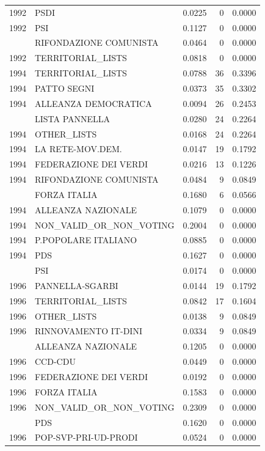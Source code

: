 \begin{longtable}[t]{rlrrr}
1992 & PSDI & 0.0225 & 0 & 0.0000\\
1992 & PSI & 0.1127 & 0 & 0.0000\\
\addlinespace
1992 & RIFONDAZIONE COMUNISTA & 0.0464 & 0 & 0.0000\\
1992 & TERRITORIAL\_LISTS & 0.0818 & 0 & 0.0000\\
1994 & TERRITORIAL\_LISTS & 0.0788 & 36 & 0.3396\\
1994 & PATTO SEGNI & 0.0373 & 35 & 0.3302\\
1994 & ALLEANZA DEMOCRATICA & 0.0094 & 26 & 0.2453\\
\addlinespace
1994 & LISTA PANNELLA & 0.0280 & 24 & 0.2264\\
1994 & OTHER\_LISTS & 0.0168 & 24 & 0.2264\\
1994 & LA RETE-MOV.DEM. & 0.0147 & 19 & 0.1792\\
1994 & FEDERAZIONE DEI VERDI & 0.0216 & 13 & 0.1226\\
1994 & RIFONDAZIONE COMUNISTA & 0.0484 & 9 & 0.0849\\
\addlinespace
1994 & FORZA ITALIA & 0.1680 & 6 & 0.0566\\
1994 & ALLEANZA NAZIONALE & 0.1079 & 0 & 0.0000\\
1994 & NON\_VALID\_OR\_NON\_VOTING & 0.2004 & 0 & 0.0000\\
1994 & P.POPOLARE ITALIANO & 0.0885 & 0 & 0.0000\\
1994 & PDS & 0.1627 & 0 & 0.0000\\
\addlinespace
1994 & PSI & 0.0174 & 0 & 0.0000\\
1996 & PANNELLA-SGARBI & 0.0144 & 19 & 0.1792\\
1996 & TERRITORIAL\_LISTS & 0.0842 & 17 & 0.1604\\
1996 & OTHER\_LISTS & 0.0138 & 9 & 0.0849\\
1996 & RINNOVAMENTO IT-DINI & 0.0334 & 9 & 0.0849\\
\addlinespace
1996 & ALLEANZA NAZIONALE & 0.1205 & 0 & 0.0000\\
1996 & CCD-CDU & 0.0449 & 0 & 0.0000\\
1996 & FEDERAZIONE DEI VERDI & 0.0192 & 0 & 0.0000\\
1996 & FORZA ITALIA & 0.1583 & 0 & 0.0000\\
1996 & NON\_VALID\_OR\_NON\_VOTING & 0.2309 & 0 & 0.0000\\
\addlinespace
1996 & PDS & 0.1620 & 0 & 0.0000\\
1996 & POP-SVP-PRI-UD-PRODI & 0.0524 & 0 & 0.0000\\

\end{longtable}
